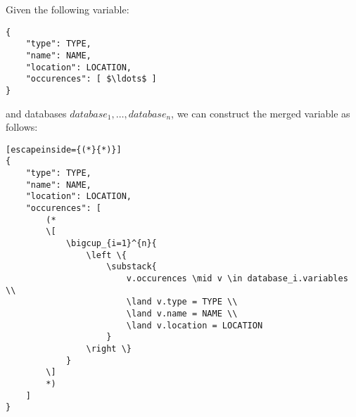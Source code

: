Given the following variable:
\begin{lstlisting}[mathescape]
{
	"type": TYPE,
	"name": NAME,
	"location": LOCATION,
	"occurences": [ $\ldots$ ]
}
\end{lstlisting}
and databases $database_1, \ldots, database_n$, we can construct the merged
variable as follows:

\begin{lstlisting}[escapeinside={(*}{*)}]
{
	"type": TYPE,
	"name": NAME,
	"location": LOCATION,
	"occurences": [
		(*
		\[
			\bigcup_{i=1}^{n}{
				\left \{
					\substack{
						v.occurences \mid v \in database_i.variables \\
						\land v.type = TYPE \\
						\land v.name = NAME \\
						\land v.location = LOCATION
					}
				\right \}
			}
		\]
		*)
	]
}
\end{lstlisting}
